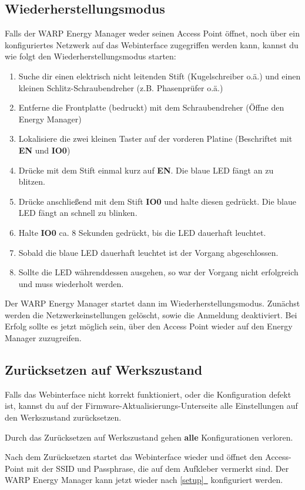 \documentclass[a4paper,10pt]{article}
\newcommand{\hint}[1]{\begin{tcolorbox}[colback=boxgray,colframe=black,coltext=
white,title=Hinweis,left*=2mm,right*=2mm,boxsep=1mm,bottom=1mm,top=1mm]#1\end{tcolorbox}}
\newcommand*{\fullref}[1]{\hyperref[{#1}]{\ref*{#1}~\nameref*{#1}}}
\begin{document}
\begin{multicols*}{2}
	\subsection{Wiederherstellungsmodus}
	\label{recovery}
	Falls der WARP Energy Manager weder seinen Access Point öffnet, noch über ein konfiguriertes Netzwerk auf das Webinterface zugegriffen werden kann,
	kannst du wie folgt den Wiederherstellungsmodus starten:
	\begin{enumerate}
	 \item Suche dir einen elektrisch nicht leitenden Stift (Kugelschreiber o.ä.) und einen kleinen Schlitz-Schraubendreher (z.B. Phasenprüfer o.ä.)
	 \item Entferne die Frontplatte (bedruckt) mit dem Schraubendreher (Öffne den Energy Manager)
	 \item Lokalisiere die zwei kleinen Taster auf der vorderen Platine (Beschriftet mit \textbf{EN} und \textbf{IO0})
	 \item Drücke mit dem Stift einmal kurz auf \textbf{EN}. Die blaue LED fängt an zu blitzen. 
	 \item Drücke anschließend mit dem Stift \textbf{IO0} und halte diesen gedrückt. Die blaue LED fängt an schnell zu blinken. 
	 \item Halte \textbf{IO0} ca. 8 Sekunden gedrückt, bis die LED dauerhaft leuchtet.
	 \item Sobald die blaue LED dauerhaft leuchtet ist der Vorgang abgeschlossen.
	 \item Sollte die LED währenddessen ausgehen, so war der Vorgang nicht erfolgreich und muss wiederholt werden.
	\end{enumerate}
	Der WARP Energy Manager startet dann im Wiederherstellungsmodus. Zunächst werden die Netzwerkeinstellungen gelöscht, sowie die Anmeldung deaktiviert.
	Bei Erfolg sollte es jetzt möglich sein, über den Access Point wieder auf den Energy Manager zuzugreifen.

	\subsection{Zurücksetzen auf Werkszustand}\label{reset}
	Falls das Webinterface nicht korrekt funktioniert, oder die Konfiguration defekt ist,
	kannst du auf der Firmware-Aktualisierungs-Unterseite alle Einstellungen auf den Werkszustand zurücksetzen.
	\hint{Durch das Zurücksetzen auf Werkszustand gehen \mbox{\textbf{alle}} Konfigurationen verloren.}
	Nach dem Zurücksetzen startet das Webinterface wieder und öffnet
	den Access-Point mit der SSID und Passphrase, die auf dem Aufkleber vermerkt
	sind. Der WARP Energy Manager kann jetzt wieder nach \fullref{setup} konfiguriert werden.


\end{multicols*}
\end{document}
